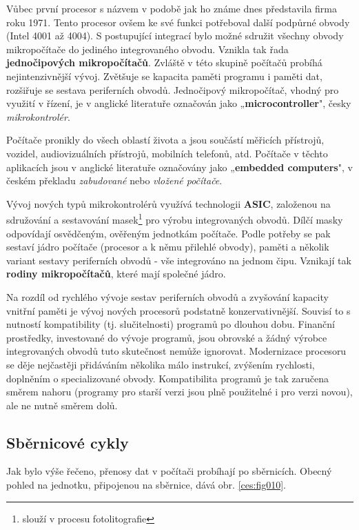    Vůbec první procesor s názvem \wikiIntelfirst v podobě jak ho známe dnes představila firma 
    \wikiIntelCompany roku 1971. Tento procesor ovšem ke své funkci potřeboval další podpůrné 
    obvody (Intel 4001 až 4004). S postupující integrací bylo možné sdružit všechny obvody 
    mikropočítače do jediného integrovaného obvodu. Vznikla tak řada \textbf{jednočipových 
    mikropočítačů}. Zvláště v této skupině počítačů probíhá nejintenzivnější vývoj. Zvětšuje se 
    kapacita paměti programu i paměti dat, rozšiřuje se sestava periferních obvodů. Jednočipový 
    mikropočítač, vhodný pro využití v řízení, je v anglické literatuře označován jako 
    „\textbf{mi\-cro\-con\-tro\-ller}", česky \emph{mikrokontrolér}.
    
    Počítače pronikly do všech oblastí života a jsou součástí měřicích přístrojů, vozidel, 
    audiovizuálních přístrojů, mobilních telefonů, atd. Počítače v těchto aplikacích jsou v 
    anglické literatuře označovány jako „\textbf{embedded computers}", v českém překladu 
    \emph{zabudované} nebo \emph{vložené počítače}.
    
    Vývoj nových typů mikrokontrolérů využívá technologii \textbf{ASIC}, založenou na sdružování a 
    sestavování masek\footnote{slouží v procesu fotolitografie} pro výrobu integrovaných obvodů. 
    Dílčí masky odpovídají osvědčeným, ověřeným jednotkám počítače. Podle potřeby se pak sestaví 
    jádro počítače (procesor a k němu přilehlé obvody), paměti a několik variant sestavy 
    periferních obvodů - vše integrováno na jednom čipu. Vznikají tak \textbf{rodiny 
    mikropočítačů}, které mají společné jádro.
    
    Na rozdíl od rychlého vývoje sestav periferních obvodů a zvyšování kapacity vnitřní paměti je 
    vývoj nových procesorů podstatně konzervativnější. Souvisí to s nutností kompatibility (tj. 
    slučitelnosti) programů po dlouhou dobu. Finanční prostředky, investované do vývoje programů, 
    jsou obrovské a žádný výrobce integrovaných obvodů tuto skutečnost nemůže ignorovat. 
    Modernizace procesoru se děje nejčastěji přidáváním několika málo instrukcí, zvýšením 
    rychlosti, doplněním o specializované obvody. Kompatibilita programů je tak zaručena směrem 
    nahoru (programy pro starší verzi jsou plně použitelné i pro verzi 
    novou), ale ne nutně směrem dolů.
    
    \subsection{Sběrnicové cykly}\label{ces:IchapIVsecIssecI}
      Jak bylo výše řečeno, přenosy dat v počítači probíhají po sběrnicích. Obecný pohled na 
      jednotku, připojenou na sběrnice, dává obr. \ref{ces:fig010}.
      
